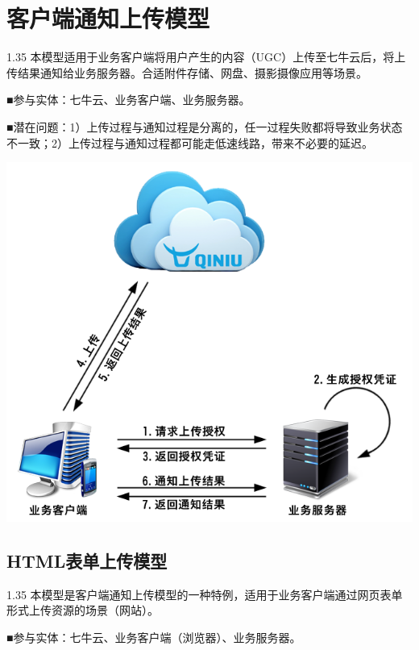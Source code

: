 \documentclass[11pt, oneside]{book}
\newcommand{\qpara}[1]{
\vspace{0.2em}
\begin{spacing}{1.35}
\noindent
#1\par
\end{spacing}
\vspace{0.2em}
}
\newcommand{\qblock}[1]{
\vspace{0.1em}
\noindent
#1\par
\vspace{0.1em}
}
\begin{document}
\clearpage

\section{客户端通知上传模型}

\qpara{本模型适用于业务客户端将用户产生的内容（UGC）上传至七牛云后，将上传结果通知给业务服务器。合适附件存储、网盘、摄影摄像应用等场景。}
\qblock{■\thinspace 参与实体：七牛云、业务客户端、业务服务器。}
\qblock{■\thinspace 潜在问题：1）上传过程与通知过程是分离的，任一过程失败都将导致业务状态不一致；2）上传过程与通知过程都可能走低速线路，带来不必要的延迟。}

\begin{center}
\includegraphics[scale=1]{../pics/upload/ugc_upload_direct.png}
\end{center}

\clearpage

\subsection{HTML表单上传模型}

\qpara{本模型是客户端通知上传模型的一种特例，适用于业务客户端通过网页表单形式上传资源的场景（网站）。}
\qblock{■\thinspace 参与实体：七牛云、业务客户端（浏览器）、业务服务器。}
\end{document}

